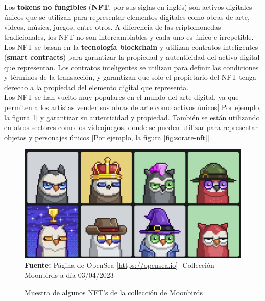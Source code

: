 Los \textbf{tokens no fungibles} (\textbf{NFT}, por sus siglas en inglés) son 
activos digitales únicos que se utilizan para representar elementos digitales 
como obras de arte, videos, música, juegos, entre otros. A diferencia de las 
criptomonedas tradicionales, los NFT no son intercambiables y cada uno es 
único e irrepetible.\\
\hfill \break
Los NFT se basan en la \textbf{tecnología blockchain} y utilizan contratos 
inteligentes (\textbf{smart contracts}) para garantizar la propiedad y 
autenticidad del activo digital que representan. Los contratos inteligentes 
se utilizan para definir las condiciones y términos de la transacción, y 
garantizan que solo el propietario del NFT tenga derecho a la propiedad del 
elemento digital que representa.\\
\hfill \break
Los NFT se han vuelto muy populares en el mundo del arte digital, ya que 
permiten a los artistas vender sus obras de arte como activos únicos[ 
Por ejemplo, la figura \ref*{fig:opensea-nft}] y garantizar su 
autenticidad y propiedad. También se están utilizando en otros sectores como 
los videojuegos, donde se pueden utilizar para representar objetos y personajes 
únicos [Por ejemplo, la figura \ref*{fig:sorare-nft}].\\
\hfill \break
\begin{figure}[htb!]
    \caption{Muestra de algunos NFT's de la collección de Moonbirds}
    \label{fig:opensea-nft}
    \centering
    \includegraphics[scale=0.25]{./Ilustraciones/opensea-nft.png}\\
    \textbf{Fuente:} Página de OpenSea [\url{https://opensea.io}]- Collección Moonbirds a día 03/04/2023
\end{figure}
\hfill \break
